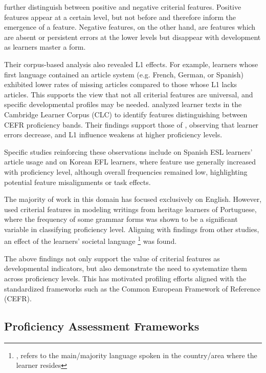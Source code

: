 \citet{Hawkins_Buttery_2010} further distinguish between positive and negative criterial features.
Positive features appear at a certain level, but not before and therefore inform the emergence of a
feature.
Negative features, on the other hand, are features which are absent or persistent errors at the lower levels but
disappear with development as learners master a form.

Their corpus-based analysis also revealed L1 effects. For example, learners whose
first language contained an article system (e.g. French, German, or Spanish) exhibited lower rates of missing articles
compared to those whose L1 lacks articles. This supports the view that not all criterial features are universal, and
specific developmental profiles may be needed. \citet{salamoura2010} analyzed learner texts in the Cambridge Learner
Corpus (CLC) to identify features distinguishing between CEFR proficiency bands. Their findings support those of \citet{Hawkins_Buttery_2010,diez-bedmar2015,Kim2021}, observing that learner errors decrease, and L1 influence weakens at higher proficiency levels.

Specific studies reinforcing these observations include \citet{diez-bedmar2015} on Spanish ESL learners' article
usage and \citet{Kim2021} on Korean EFL learners, where feature use generally increased with proficiency level,
although overall frequencies remained low, highlighting potential feature misalignments or task effects.

The majority of work in this domain has focused exclusively on English. However, \citet{akef2025} used criterial
features in modeling writings from heritage learners of Portuguese, where the frequency of some grammar forms
was shown
to be a significant variable in classifying proficiency level. Aligning with findings from other studies, an effect
of the learners' societal language \footnote{, refers to the main/majority language spoken in the country/area where
the learner resides}
was found.

The above findings not only support the value of criterial features as developmental indicators, but also
demonstrate the need to systematize them across proficiency levels. This has motivated profiling efforts
\cite{Saville2010}
aligned
with
the standardized frameworks such as the Common European Framework of Reference (CEFR).



\subsection{Proficiency Assessment Frameworks}

